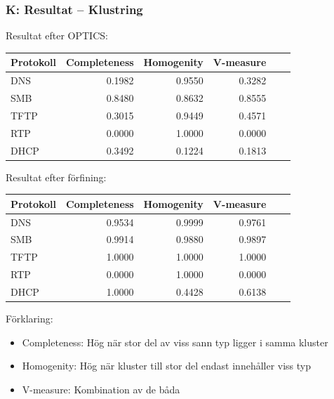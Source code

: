 \documentclass[xetex, 8pt]{beamer}
\begin{document}
    \begin{frame}
        \frametitle{K: Resultat -- Klustring}
        Resultat efter OPTICS:
        \begin{table}[h]
            \centering
            \scriptsize{
                \begin{tabular}{| l | r | r | r | r | r |}
                    \hline
                    \textbf{Protokoll}&\textbf{Completeness}&\textbf{Homogenity}&\textbf{V-measure} \\ \hline
                    DNS & 0.1982 & 0.9550 & 0.3282 \\ \hline
                    SMB & 0.8480 & 0.8632 & 0.8555 \\ \hline
                    TFTP & 0.3015 & 0.9449 & 0.4571 \\ \hline
                    RTP & 0.0000 & 1.0000 & 0.0000 \\ \hline
                    DHCP & 0.3492 & 0.1224 & 0.1813 \\ \hline
                \end{tabular}
            }
        \end{table}
        Resultat efter förfining:
        \begin{table}[h]
            \centering
            \scriptsize{
                \begin{tabular}{| l | r | r | r | r | r |}
                    \hline
                    \textbf{Protokoll}&\textbf{Completeness}&\textbf{Homogenity}&\textbf{V-measure} \\ \hline
                    DNS & 0.9534 & 0.9999 & 0.9761 \\ \hline
                    SMB & 0.9914 & 0.9880 & 0.9897 \\ \hline
                    TFTP & 1.0000 & 1.0000 & 1.0000 \\ \hline
                    RTP & 0.0000 & 1.0000 & 0.0000 \\ \hline
                    DHCP & 1.0000 & 0.4428 & 0.6138 \\ \hline
                \end{tabular}
            }
        \end{table}
        Förklaring:
        \begin{itemize}
            \item Completeness: Hög när stor del av viss sann typ ligger i
                samma kluster
            \item Homogenity: Hög när kluster till stor del endast innehåller
                viss typ
            \item V-measure: Kombination av de båda
        \end{itemize}
    \end{frame}
\end{document}
